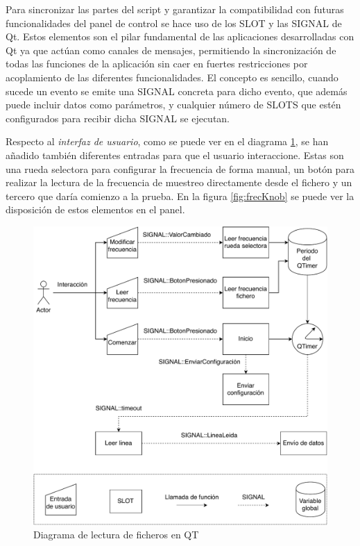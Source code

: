         Para sincronizar las partes del script y garantizar la compatibilidad con futuras funcionalidades del panel de control se hace uso de los SLOT y las SIGNAL de Qt. Estos elementos son el pilar fundamental de las aplicaciones desarrolladas con Qt ya que actúan como canales de mensajes, permitiendo la sincronización de todas las funciones de la aplicación sin caer en fuertes restricciones por acoplamiento de las diferentes funcionalidades. El concepto es sencillo, cuando sucede un evento se emite una SIGNAL concreta para dicho evento, que además puede incluir datos como parámetros, y cualquier número de SLOTS que estén configurados para recibir dicha SIGNAL se ejecutan. 

        Respecto al \textit{interfaz de usuario}, como se puede ver en el diagrama \ref{fig:CompleteFileRead}, se han añadido también diferentes entradas para que el usuario interaccione. Estas son una rueda selectora para configurar la frecuencia de forma manual, un botón para realizar la lectura de la frecuencia de muestreo directamente desde el fichero y un tercero que daría comienzo a la prueba. En la figura \ref{fig:frecKnob} se puede ver la disposición de estos elementos en el panel.

        \begin{figure} [H] 
                \centering
                        \includegraphics[width =\linewidth]{figuras/CompleteFileRead.pdf}
                \caption{Diagrama de lectura de ficheros en QT}
                \label{fig:CompleteFileRead}
        \end{figure}

